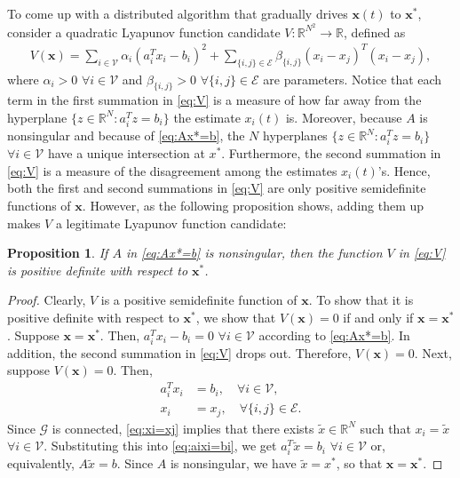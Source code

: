 \documentclass[11pt]{article}
\theoremstyle{plain}
\newtheorem{proposition}{Proposition}
\theoremstyle{definition}
\theoremstyle{remark}
\begin{document}
To come up with a distributed algorithm that gradually drives $\mathbf{x}(t)$ to $\mathbf{x}^*$, consider a quadratic Lyapunov function candidate $V:\mathbb{R}^{N^2}\rightarrow\mathbb{R}$, defined as
\begin{align}
V(\mathbf{x})=\sum_{i\in\mathcal{V}}\alpha_i(a_i^Tx_i-b_i)^2+\sum_{\{i,j\}\in\mathcal{E}}\beta_{\{i,j\}}(x_i-x_j)^T(x_i-x_j),\label{eq:V}
\end{align}
where $\alpha_i>0$ $\forall i\in\mathcal{V}$ and $\beta_{\{i,j\}}>0$ $\forall\{i,j\}\in\mathcal{E}$ are parameters. Notice that each term in the first summation in \eqref{eq:V} is a measure of how far away from the hyperplane $\{z\in\mathbb{R}^N:a_i^Tz=b_i\}$ the estimate $x_i(t)$ is. Moreover, because $A$ is nonsingular and because of \eqref{eq:Ax*=b}, the $N$ hyperplanes $\{z\in\mathbb{R}^N:a_i^Tz=b_i\}$ $\forall i\in\mathcal{V}$ have a unique intersection at $x^*$. Furthermore, the second summation in \eqref{eq:V} is a measure of the disagreement among the estimates $x_i(t)$'s. Hence, both the first and second summations in \eqref{eq:V} are only positive semidefinite functions of $\mathbf{x}$. However, as the following proposition shows, adding them up makes $V$ a legitimate Lyapunov function candidate:

\begin{proposition}\label{pro:AVpd}
If $A$ in \eqref{eq:Ax*=b} is nonsingular, then the function $V$ in \eqref{eq:V} is positive definite with respect to $\mathbf{x}^*$.
\end{proposition}

\begin{proof}
Clearly, $V$ is a positive semidefinite function of $\mathbf{x}$. To show that it is positive definite with respect to $\mathbf{x}^*$, we show that $V(\mathbf{x})=0$ if and only if $\mathbf{x}=\mathbf{x}^*$. Suppose $\mathbf{x}=\mathbf{x}^*$. Then, $a_i^Tx_i-b_i=0$ $\forall i\in\mathcal{V}$ according to \eqref{eq:Ax*=b}. In addition, the second summation in \eqref{eq:V} drops out. Therefore, $V(\mathbf{x})=0$. Next, suppose $V(\mathbf{x})=0$. Then,
\begin{align}
a_i^Tx_i&=b_i,\quad\forall i\in\mathcal{V},\label{eq:aixi=bi}\\
x_i&=x_j,\quad\forall\{i,j\}\in\mathcal{E}.\label{eq:xi=xj}
\end{align}
Since $\mathcal{G}$ is connected, \eqref{eq:xi=xj} implies that there exists $\tilde{x}\in\mathbb{R}^N$ such that $x_i=\tilde{x}$ $\forall i\in\mathcal{V}$. Substituting this into \eqref{eq:aixi=bi}, we get $a_i^T\tilde{x}=b_i$ $\forall i\in\mathcal{V}$ or, equivalently, $A\tilde{x}=b$. Since $A$ is nonsingular, we have $\tilde{x}=x^*$, so that $\mathbf{x}=\mathbf{x}^*$.
\end{proof}
\end{document}
